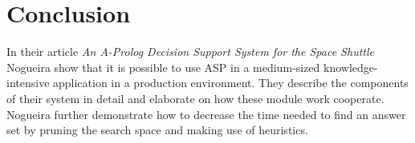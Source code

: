 \documentclass[runningheads]{llncs}
\newcommand{\papertitle}{An A-Prolog Decision Support System for the Space Shuttle}
\newcommand{\authorquote}{Nogueira \etal}
\begin{document}
\section{Conclusion} \label{sec:conclusion}

In their article \textit{\papertitle{}} \authorquote{} show that it is possible to use ASP in a medium-sized knowledge-intensive application in a production environment. They describe the components of their system in detail and elaborate on how these module work cooperate. \authorquote{} further demonstrate how to decrease the time needed to find an answer set by pruning the search space and making use of heuristics. 





\end{document}
